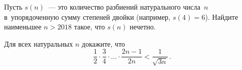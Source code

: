 \begin{problems}
\item
Пусть $s(n)$~--- это количество разбиений натурального числа~$n$
в~упорядоченную сумму степеней двойки (например, $s(4) = 6$).
Найдите наименьшее $n > 2018$ такое, что $s(n)$ нечетно.


\item
Для всех натуральных $n$ докажите, что
\[
    \frac{1}{2} \cdot \frac{3}{4}
    \cdot \ldots \cdot
    \frac{2 n - 1}{2 n}
<
    \frac{1}{\sqrt{3 n}}
\, . \]

\end{problems}

